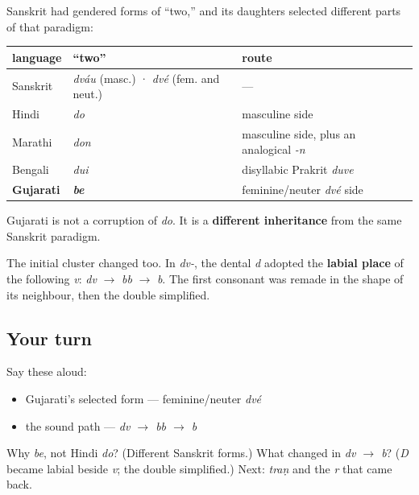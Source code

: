 \begin{cousinweb}
Sanskrit had gendered forms of “two,” and its daughters selected different parts of that paradigm:

\noindent
\begin{tabularx}{\linewidth}{@{}>{\raggedright\arraybackslash}X>{\raggedright\arraybackslash}X>{\raggedright\arraybackslash}X@{}}
\toprule
\textbf{language} & \textbf{“two”} & \textbf{route} \\
\midrule
Sanskrit & \emph{dváu} (masc.) · \emph{dvé} (fem. and neut.) & — \\
Hindi & \emph{do} & masculine side \\
Marathi & \emph{don} & masculine side, plus an analogical \emph{-n} \\
Bengali & \emph{dui} & disyllabic Prakrit \emph{duve} \\
\textbf{Gujarati} & \emph{\textbf{be}} & feminine/neuter \emph{dvé} side \\
\bottomrule
\end{tabularx}

Gujarati \textbf{} is not a corruption of \emph{do}. It is a \textbf{different inheritance} from the same Sanskrit paradigm.

The initial cluster changed too. In \emph{dv-}, the dental \emph{d} adopted the \textbf{labial place} of the following \emph{v}: \emph{dv} $\to$ \emph{bb} $\to$ \emph{b}. The first consonant was remade in the shape of its neighbour, then the double simplified.
\end{cousinweb}

\subsection*{Your turn}
Say these aloud:

\begin{itemize}
\raggedright
  \item Gujarati's selected form — feminine/neuter \emph{dvé}
  \item the sound path — \emph{dv $\to$ bb $\to$ b}
\end{itemize}

\begin{tcolorbox}[breakable,colback=teal!4,colframe=teal!35!black,title={Before you move on}]
Why \emph{be}, not Hindi \emph{do}? (Different Sanskrit forms.) What changed in \emph{dv $\to$ b}? (\emph{D} became labial beside \emph{v}; the double simplified.) Next: \emph{traṇ} and the \emph{r} that came back.
\end{tcolorbox}
